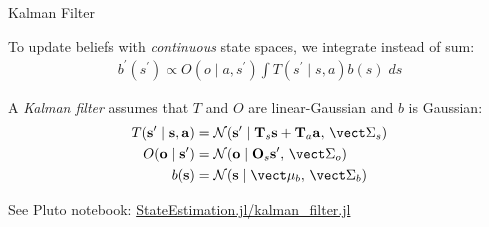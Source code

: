 \begin{frame}[fragile]{Kalman Filter}

To update beliefs with \textit{continuous} state spaces, we integrate instead of sum:
\begin{gather*}
    b^\prime(s^\prime) \propto O(o \mid a, s^\prime)\int T(s^\prime \mid s, a)b(s)\;ds    
\end{gather*}

A \textit{Kalman filter} assumes that $T$ and $O$ are linear-Gaussian and $b$ is Gaussian:
\begin{align*}
    T(\mathbf{s}^\prime \mid \mathbf s, \mathbf a) &= \mathcal{N}(\mathbf{s}^\prime \mid \mathbf{T}_s \mathbf{s} + \mathbf{T}_a \mathbf{a},\, \mat{\Sigma}_s)\\
    O(\mathbf o \mid \mathbf{s}^\prime) &= \mathcal{N}(\mathbf o \mid \mathbf{O}_s \mathbf{s}^\prime,\, \mat{\Sigma}_o)\\
    b(\mathbf{s}) &= \mathcal{N}(\mathbf{s} \mid \vec{\mu}_b,\, \mat{\Sigma}_b)
\end{align*}


See Pluto notebook: \href{http://htmlview.glitch.me/?https://raw.githubusercontent.com/sisl/StateEstimation.jl/master/html/kalman_filter.html}{\color{cardinal}StateEstimation.jl/kalman\_filter.jl}

\end{frame}